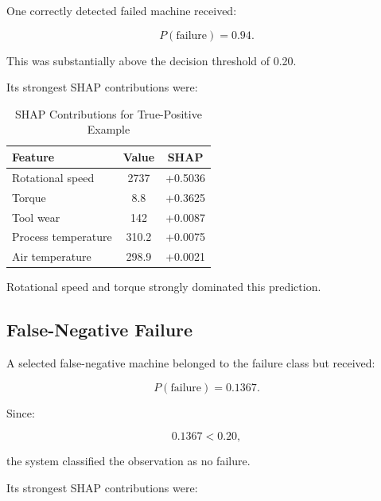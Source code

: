 \documentclass[conference]{IEEEtran}
\begin{document}
One correctly detected failed machine received:

\[
P(\mathrm{failure}) = 0.94.
\]

This was substantially above the decision threshold of 0.20.

Its strongest SHAP contributions were:

\begin{table}[htbp]

\caption{SHAP Contributions for True-Positive Example}

\centering

\begin{tabular}{lcc}

\toprule

\textbf{Feature} &
\textbf{Value} &
\textbf{SHAP}\\

\midrule

Rotational speed & 2737 & +0.5036\\
Torque & 8.8 & +0.3625\\
Tool wear & 142 & +0.0087\\
Process temperature & 310.2 & +0.0075\\
Air temperature & 298.9 & +0.0021\\

\bottomrule

\end{tabular}

\end{table}

Rotational speed and torque strongly dominated this prediction.

\subsection{False-Negative Failure}

A selected false-negative machine belonged to the failure class but received:

\[
P(\mathrm{failure}) = 0.1367.
\]

Since:

\[
0.1367 < 0.20,
\]

the system classified the observation as no failure.

Its strongest SHAP contributions were:
\end{document}

